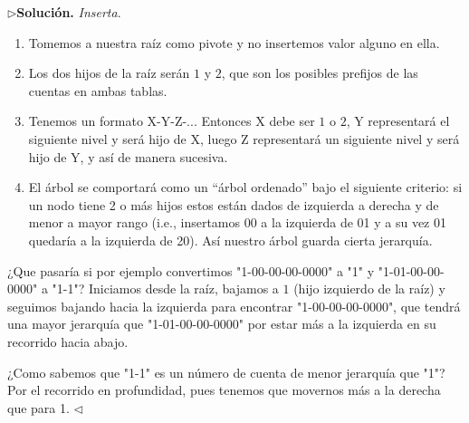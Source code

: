 $\rhd$\textbf{Solución.} \textit{Inserta}.
\begin{enumerate}
\item Tomemos a nuestra raíz como pivote y no insertemos valor alguno en ella.
\item Los dos hijos de la raíz serán $1$ y $2$, que son los posibles prefijos de las cuentas en ambas tablas.
\item Tenemos un formato X-Y-Z-... Entonces X debe ser $1$ o $2$, Y representará el siguiente nivel y será hijo
de X, luego Z representará un siguiente nivel y será hijo de Y, y así de manera sucesiva.
\item El árbol se comportará como un ``árbol ordenado'' bajo el siguiente criterio: si un nodo tiene 2 o más hijos estos
están dados de izquierda a derecha y de menor a mayor rango (i.e., insertamos 00 a la izquierda de 01 y a su vez 01
quedaría a la izquierda de 20). Así nuestro árbol guarda cierta jerarquía.
\end{enumerate}

¿Que pasaría si por ejemplo convertimos "1-00-00-00-0000" a "1" y "1-01-00-00-0000" a "1-1"? Iniciamos desde la raíz,
bajamos a $1$ (hijo izquierdo de la raíz) y seguimos bajando hacia la izquierda para encontrar "1-00-00-00-0000",
que tendrá una mayor jerarquía que "1-01-00-00-0000" por estar más a la izquierda en su recorrido hacia abajo.\newline

 ¿Como sabemos que "1-1" es un número de cuenta de menor jerarquía que "1"? Por el recorrido en profundidad, pues tenemos que
 movernos más a la derecha que para 1.
\hfill $\lhd$
